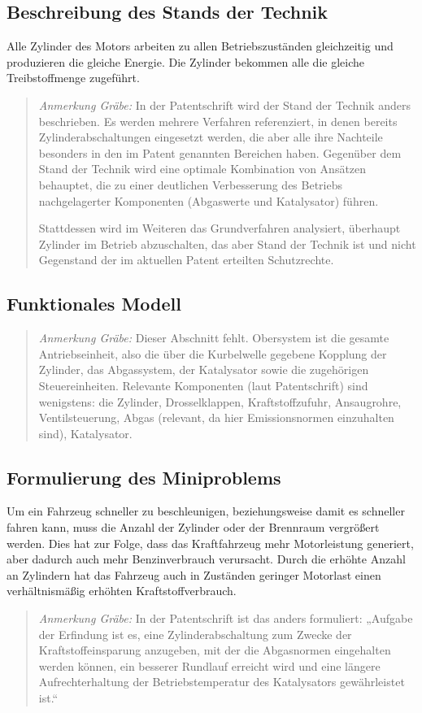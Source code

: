 \documentclass[11pt,a4paper]{article}
\newcommand{\HGG}[1]{\begin{quote} \emph{Anmerkung Gräbe:} #1  \end{quote}}
\begin{document}
\subsection{Beschreibung des Stands der Technik}
Alle Zylinder des Motors arbeiten zu allen Betriebszuständen gleichzeitig und
produzieren die gleiche Energie. Die Zylinder bekommen alle die gleiche
Treibstoffmenge zugeführt.

\HGG{In der Patentschrift wird der Stand der Technik anders beschrieben. Es
  werden mehrere Verfahren referenziert, in denen bereits
  Zylinderabschaltungen eingesetzt werden, die aber alle ihre Nachteile
  besonders in den im Patent genannten Bereichen haben.  Gegenüber dem Stand
  der Technik wird eine optimale Kombination von Ansätzen behauptet, die zu
  einer deutlichen Verbesserung des Betriebs nachgelagerter Komponenten
  (Abgaswerte und Katalysator) führen.

  Stattdessen wird im Weiteren das Grundverfahren analysiert, überhaupt
  Zylinder im Betrieb abzuschalten, das aber Stand der Technik ist und nicht
  Gegenstand der im aktuellen Patent erteilten Schutzrechte. }

\subsection{Funktionales Modell}

\HGG{Dieser Abschnitt fehlt. Obersystem ist die gesamte Antriebseinheit, also
  die über die Kurbelwelle gegebene Kopplung der Zylinder, das Abgassystem,
  der Katalysator sowie die zugehörigen Steuereinheiten.  Relevante
  Komponenten (laut Patentschrift) sind wenigstens: die Zylinder,
  Drosselklappen, Kraftstoffzufuhr, Ansaugrohre, Ventilsteuerung, Abgas
  (relevant, da hier Emissionsnormen einzuhalten sind), Katalysator. }

\subsection{Formulierung des Miniproblems}
Um ein Fahrzeug schneller zu beschleunigen, beziehungsweise damit es schneller
fahren kann, muss die Anzahl der Zylinder oder der Brennraum vergrößert
werden. Dies hat zur Folge, dass das Kraftfahrzeug mehr Motorleistung
generiert, aber dadurch auch mehr Benzinverbrauch verursacht.  Durch die
erhöhte Anzahl an Zylindern hat das Fahrzeug auch in Zuständen geringer
Motorlast einen verhältnismäßig erhöhten Kraftstoffverbrauch.

\HGG{In der Patentschrift ist das anders formuliert: „Aufgabe der Erfindung
  ist es, eine Zylinderabschaltung zum Zwecke der Kraftstoffeinsparung
  anzugeben, mit der die Abgasnormen eingehalten werden können, ein besserer
  Rundlauf erreicht wird und eine längere Aufrechterhaltung der
  Betriebstemperatur des Katalysators gewährleistet ist.“}
\end{document}
